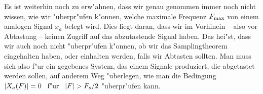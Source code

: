 Es ist weiterhin noch zu erw"ahnen, dass wir genau genommen immer noch nicht wissen, wie wir "uberpr"ufen k"onnen, welche maximale Frequenz $F_{\rm max}$ von einem analogen Signal $x_a$ belegt wird.
Dies liegt daran, dass wir im Vorhinein -- also vor Abtastung -- keinen Zugriff auf das abzutastende Signal haben.
Das hei"st, dass wir auch noch nicht "uberpr"ufen k"onnen, ob wir das Samplingtheorem eingehalten haben, oder einhalten werden, falls wir Abtasten sollten.
Man muss sich also f"ur ein gegebenes System, das einem Signale produziert, die abgetastet werden sollen, auf anderem Weg "uberlegen, wie man die Bedingung ${\left| X_a(F) \right|} = 0 {\hspace{3mm} \text{f"ur} \hspace{3mm}} {\left| F \right|} > F_s/2$ "uberpr"ufen kann.

\FloatBarrier

